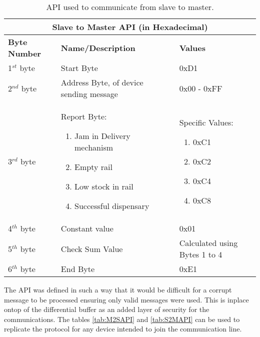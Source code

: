 \documentclass[a4paper,11pt]{article}
\numberwithin{figure}{section}
\numberwithin{table}{section}
\begin{document}
	\begin{center}
		\begin{table}[ht]
			\centering
			\begin{tabular}{| m{3cm} | m{5cm}| m{5cm} |}
			\hline
			\multicolumn{3}{|c|}{\bfseries Slave to Master API (in Hexadecimal)}\\
			\hline
			\bfseries{Byte Number}  & \bfseries{Name/Description} & \bfseries{Values} \\
			\hline
			1$^{st}$ byte & Start Byte & 0xD1\\
			\hline
			2$^{nd}$ byte & Address Byte, of device sending message & 0x00 - 0xFF\\
			\hline
			3$^{rd}$ byte & Report Byte:\begin{enumerate}
											\setlength{\itemsep}{0pt}
   											\setlength{\parskip}{0pt}
    										\setlength{\parsep}{0pt} 
											\item Jam in Delivery mechanism
											\item Empty rail
											\item Low stock in rail
											\item Successful dispensary
										\end{enumerate} & Specific Values: \begin{enumerate}
																				\setlength{\itemsep}{0pt}
   																				\setlength{\parskip}{0pt}
    																			\setlength{\parsep}{0pt} 
																				\item 0xC1
																				\item 0xC2
																				\item 0xC4
																				\item 0xC8
																			\end{enumerate}\\
			\hline
			4$^{th}$ byte & Constant value & 0x01 \\
			\hline
			5$^{th}$ byte & Check Sum Value & Calculated using Bytes 1 to 4\\
			\hline
			6$^{th}$ byte & End Byte & 0xE1 \\
			\hline
			\end{tabular}
		\caption{API used to communicate from slave to master. \label{tab:S2MAPI}}
		\end{table}
	\end{center}

The API was defined in such a way that it would be difficult for a corrupt message to be processed ensuring only valid messages were used. This is inplace ontop of the differential buffer as an added layer of security for the communications. The tables \autoref{tab:M2SAPI} and \autoref{tab:S2MAPI} can be used to replicate the protocol for any device intended to join the communication line.
\end{document}
